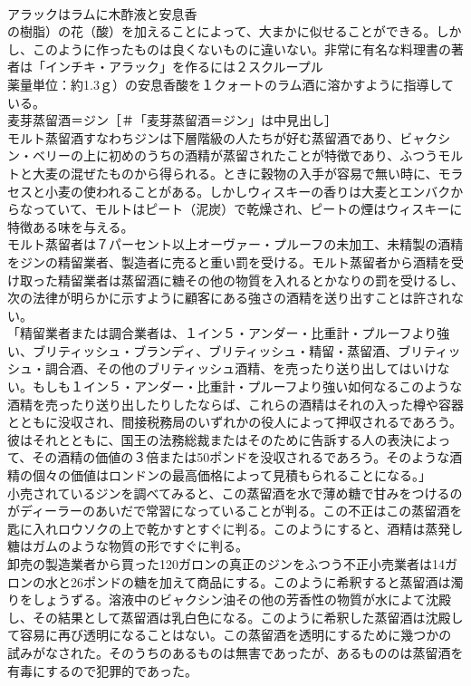\documentclass[8pt]{extreport}
\begin{document}
\begin{CJK}{UTF8}{min}
\\	アラックはラムに木酢液と安息香
\\	の樹脂）の花（酸）を加えることによって、大まかに似せることができる。しかし、このように作ったものは良くないものに違いない。非常に有名な料理書の著者は「インチキ・アラック」を作るには２スクループル
\\	薬量単位：約1.3ｇ）の安息香酸を１クォートのラム酒に溶かすように指導している。
\\	麦芽蒸留酒＝ジン［＃「麦芽蒸留酒＝ジン」は中見出し］
\\	モルト蒸留酒すなわちジンは下層階級の人たちが好む蒸留酒であり、ビャクシン・ベリーの上に初めのうちの酒精が蒸留されたことが特徴であり、ふつうモルトと大麦の混ぜたものから得られる。ときに穀物の入手が容易で無い時に、モラセスと小麦の使われることがある。しかしウィスキーの香りは大麦とエンバクからなっていて、モルトはピート（泥炭）で乾燥され、ピートの煙はウィスキーに特徴ある味を与える。
\\	モルト蒸留者は７パーセント以上オーヴァー・プルーフの未加工、未精製の酒精をジンの精留業者、製造者に売ると重い罰を受ける。モルト蒸留者から酒精を受け取った精留業者は蒸留酒に糖その他の物質を入れるとかなりの罰を受けるし、次の法律が明らかに示すように顧客にある強さの酒精を送り出すことは許されない。
\\	「精留業者または調合業者は、１イン５・アンダー・比重計・プルーフより強い、ブリティッシュ・ブランディ、ブリティッシュ・精留・蒸留酒、ブリティッシュ・調合酒、その他のブリティッシュ酒精、を売ったり送り出してはいけない。もしも１イン５・アンダー・比重計・プルーフより強い如何なるこのような酒精を売ったり送り出したりしたならば、これらの酒精はそれの入った樽や容器とともに没収され、間接税務局のいずれかの役人によって押収されるであろう。彼はそれとともに、国王の法務総裁またはそのために告訴する人の表決によって、その酒精の価値の３倍または50ポンドを没収されるであろう。そのような酒精の個々の価値はロンドンの最高価格によって見積もられることになる。」
\\	小売されているジンを調べてみると、この蒸留酒を水で薄め糖で甘みをつけるのがディーラーのあいだで常習になっていることが判る。この不正はこの蒸留酒を匙に入れロウソクの上で乾かすとすぐに判る。このようにすると、酒精は蒸発し糖はガムのような物質の形ですぐに判る。
\\	卸売の製造業者から買った120ガロンの真正のジンをふつう不正小売業者は14ガロンの水と26ポンドの糖を加えて商品にする。このように希釈すると蒸留酒は濁りをしょうずる。溶液中のビャクシン油その他の芳香性の物質が水によて沈殿し、その結果として蒸留酒は乳白色になる。このように希釈した蒸留酒は沈殿して容易に再び透明になることはない。この蒸留酒を透明にするために幾つかの試みがなされた。そのうちのあるものは無害であったが、あるもののは蒸留酒を有毒にするので犯罪的であった。

\end{CJK}
\end{document}

